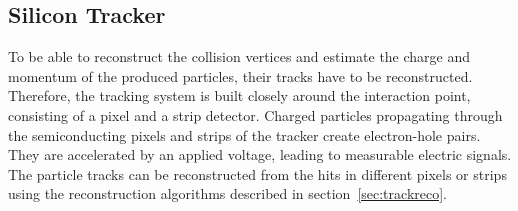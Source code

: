 \subsection*{Silicon Tracker}
To be able to reconstruct the collision vertices and estimate the charge and momentum of the produced particles, their tracks have to be reconstructed. Therefore, the tracking system is built closely around the interaction point, consisting of a pixel and a strip detector. Charged particles propagating through the semiconducting pixels and strips of the tracker create electron-hole pairs. They are accelerated by an applied voltage, leading to measurable electric signals. The particle tracks can be reconstructed from the hits in different pixels or strips using the reconstruction algorithms described in section~\ref{sec:trackreco}.\\

